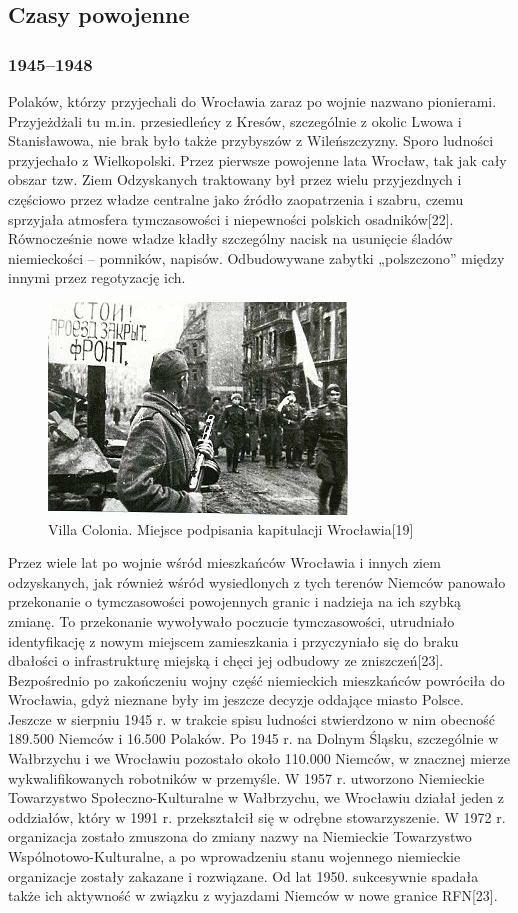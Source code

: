 \documentclass{article}
\begin{document}
\subsection{Czasy powojenne}
\subsubsection{1945–1948}
Polaków, którzy przyjechali do Wrocławia zaraz po wojnie nazwano pionierami. Przyjeżdżali tu m.in. przesiedleńcy z Kresów, szczególnie z okolic Lwowa i Stanisławowa, nie brak było także przybyszów z Wileńszczyzny. Sporo ludności przyjechało z Wielkopolski. Przez pierwsze powojenne lata Wrocław, tak jak cały obszar tzw. Ziem Odzyskanych traktowany był przez wielu przyjezdnych i częściowo przez władze centralne jako źródło zaopatrzenia i szabru, czemu sprzyjała atmosfera tymczasowości i niepewności polskich osadników[22]. Równocześnie nowe władze kładły szczególny nacisk na usunięcie śladów niemieckości – pomników, napisów. Odbudowywane zabytki „polszczono” między innymi przez regotyzację ich.
\bigskip
\newline
\begin{figure}[h]
\centering
\includegraphics[scale=2]{15.jpg}
\caption{Villa Colonia. Miejsce podpisania kapitulacji Wrocławia[19]}
\end{figure}
\bigskip
\newline
Przez wiele lat po wojnie wśród mieszkańców Wrocławia i innych ziem odzyskanych, jak również wśród wysiedlonych z tych terenów Niemców panowało przekonanie o tymczasowości powojennych granic i nadzieja na ich szybką zmianę. To przekonanie wywoływało poczucie tymczasowości, utrudniało identyfikację z nowym miejscem zamieszkania i przyczyniało się do braku dbałości o infrastrukturę miejską i chęci jej odbudowy ze zniszczeń[23].
\bigskip
\newline
Bezpośrednio po zakończeniu wojny część niemieckich mieszkańców powróciła do Wrocławia, gdyż nieznane były im jeszcze decyzje oddające miasto Polsce. Jeszcze w sierpniu 1945 r. w trakcie spisu ludności stwierdzono w nim obecność 189.500 Niemców i 16.500 Polaków. Po 1945 r. na Dolnym Śląsku, szczególnie w Wałbrzychu i we Wrocławiu pozostało około 110.000 Niemców, w znacznej mierze wykwalifikowanych robotników w przemyśle. W 1957 r. utworzono Niemieckie Towarzystwo Społeczno-Kulturalne w Wałbrzychu, we Wrocławiu działał jeden z oddziałów, który w 1991 r. przekształcił się w odrębne stowarzyszenie. W 1972 r. organizacja zostało zmuszona do zmiany nazwy na Niemieckie Towarzystwo Wspólnotowo-Kulturalne, a po wprowadzeniu stanu wojennego niemieckie organizacje zostały zakazane i rozwiązane. Od lat 1950. sukcesywnie spadała także ich aktywność w związku z wyjazdami Niemców w nowe granice RFN[23].
\end{document}
